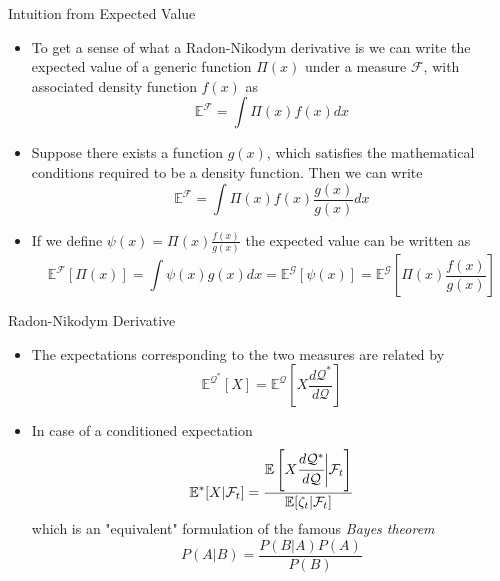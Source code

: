 \documentclass{beamer}
\begin{document}
\begin{frame}{Intuition from Expected Value}
  \begin{itemize}
  \item To get a sense of what a Radon-Nikodym derivative is we can write the expected value of a generic function $\Pi(x)$ under a measure $\mathcal{F}$, with associated density function $f(x)$ as
    \begin{equation*}
      \mathbb{E}^\mathcal{F}=\int\Pi(x)f(x)dx
    \end{equation*}
  \item Suppose there exists a function $g(x)$, which satisfies the mathematical conditions required to be a density function. Then we can write
    \begin{equation*}
      \mathbb{E}^\mathcal{F}=\int\Pi(x)f(x)\frac{g(x)}{g(x)}dx
    \end{equation*}
  \item If we define $\psi(x)=\Pi(x)\frac{f(x)}{g(x)}$ the expected value can be written as 
    \begin{equation*}
      \mathbb{E}^\mathcal{F}[\Pi(x)]=\int\psi(x)g(x)dx=\mathbb{E}^\mathcal{G}[\psi(x)]=\mathbb{E}^\mathcal{G}\left[\Pi(x)\frac{f(x)}{g(x)}\right]
    \end{equation*}
  \end{itemize}
\end{frame}

\begin{frame}{Radon-Nikodym Derivative}
  \begin{itemize}
  \item The expectations corresponding to the two measures are related by
    \begin{equation*}
      \mathbb{E}^{\mathcal{Q}^*}[X] = \mathbb{E}^\mathcal{Q}\left[X\frac{d\mathcal{Q}^*}{d\mathcal{Q}}\right]
    \end{equation*}
	\pause
  \item In case of a conditioned expectation
    \begin{equation}
      \mathbb{E}^*[X|\mathcal{F}_t] = \frac{\mathbb{E}\left[X\cfrac{d\mathcal{Q}^*}{d\mathcal{Q}}\bigg|\mathcal{F}_t\right]}{\mathbb{E}[\zeta_t|\mathcal{F}_t]}
      \label{eq:conditioned_expectation}
    \end{equation}
    which is an "equivalent" formulation of the famous \emph{Bayes theorem}
    \begin{equation*}
      P(A|B)=\frac{P(B|A)P(A)}{P(B)}
    \end{equation*}
  \end{itemize}
\end{frame}
\end{document}
